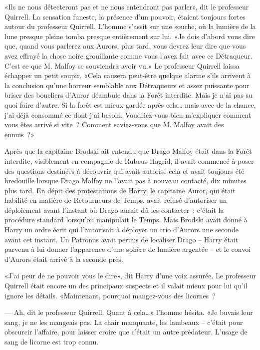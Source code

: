 «Ils ne nous détecteront pas et ne nous entendront pas parler», dit le professeur Quirrell. La sensation funeste, la présence d'un pouvoir, étaient toujours fortes autour du professeur Quirrell. L'homme s'assit sur une souche, où la lumière de la lune presque pleine tomba presque entièrement sur lui. «Je dois d'abord vous dire que, quand vous parlerez aux Aurors, plus tard, vous devrez leur dire que vous avez effrayé la chose noire grouillante comme vous l'avez fait avec ce Détraqueur. C'est ce que M. Malfoy se souviendra avoir vu.» Le professeur Quirrell laissa échapper un petit soupir. «Cela causera peut-être quelque alarme s'ils arrivent à la conclusion qu'une horreur semblable aux Détraqueurs et assez puissante pour briser des boucliers d'Auror déambule dans la Forêt interdite. Mais je n'ai pas su quoi faire d'autre. Si la forêt est mieux gardée après cela… mais avec de la chance, j'ai déjà consommé ce dont j'ai besoin. Voudriez-vous bien m'expliquer comment vous êtes arrivé si vite~? Comment saviez-vous que M. Malfoy avait des ennuis~?»

Après que la capitaine Brodski ait entendu que Drago Malfoy était dans la Forêt interdite, visiblement en compagnie de Rubeus Hagrid, il avait commencé à poser des questions destinées à découvrir qui avait autorisé cela et avait toujours été bredouille lorsque Drago Malfoy ne l'avait pas à nouveau contacté, dix minutes plus tard. En dépit des protestations de Harry, le capitaine Auror, qui était habilité en matière de Retourneurs de Temps, avait refusé d'autoriser un déploiement avant l'instant où Drago aurait dû les contacter~; c'était la procédure standard lorsqu'on manipulait le Temps. Mais Brodski avait donné à Harry un ordre écrit qui l'autorisait à déployer un trio d'Aurors une seconde avant cet instant. Un Patronus avait permis de localiser Drago -- Harry était parvenu à lui donner l'apparence d'une sphère de lumière argentée -- et le convoi d'Aurors était arrivé à la seconde près.

«J'ai peur de ne pouvoir vous le dire», dit Harry d'une voix assurée. Le professeur Quirrell était encore un des principaux suspects et il valait mieux pour lui qu'il ignore les détails. «Maintenant, pourquoi mangez-vous des licornes~?

--- Ah, dit le professeur Quirrell. Quant à cela…» l'homme hésita. «Je buvais leur sang, je ne les mangeais pas. La chair manquante, les lambeaux -- c'était pour obscurcir l'affaire, pour laisser croire que c'était un autre prédateur. L'usage de sang de licorne est trop connu.

